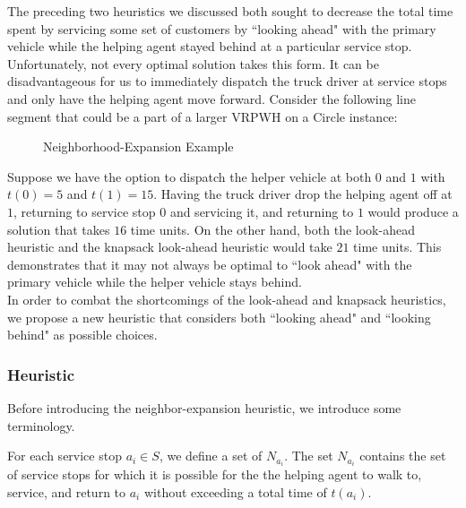 \documentclass[12pt]{scrartcl}
\begin{document}
The preceding two heuristics we discussed both sought to decrease the total time spent by servicing some set of customers by ``looking ahead" with the primary vehicle while the helping agent stayed behind at a particular service stop. \\

Unfortunately, not every optimal solution takes this form. It can be disadvantageous for us to immediately dispatch the truck driver at service stops and only have the helping agent move forward. Consider the following line segment that could be a part of a larger VRPWH on a Circle instance:

\begin{figure}[H]
  \centering
  \caption{Neighborhood-Expansion Example}
\end{figure}

Suppose we have the option to dispatch the helper vehicle at both $0$ and $1$ with $t(0) = 5$ and $t(1) = 15$. Having the truck driver drop the helping agent off at $1$, returning to service stop $0$ and servicing it, and returning to $1$ would produce a solution that takes $16$ time units. On the other hand, both the look-ahead heuristic and the knapsack look-ahead heuristic would take $21$ time units. This demonstrates that it may not always be optimal to ``look ahead" with the primary vehicle while the helper vehicle stays behind. \\

In order to combat the shortcomings of the look-ahead and knapsack heuristics, we propose a new heuristic that considers both ``looking ahead" and ``looking behind" as possible choices. 

\subsubsection{Heuristic}
Before introducing the neighbor-expansion heuristic, we introduce some terminology.

\begin{definition}
For each service stop $a_i \in S$, we define a set of  $N_{a_{i}}$. The set $N_{a_{i}}$ contains the set of service stops for which it is possible for the the helping agent to walk to, service, and return to $a_i$ without exceeding a total time of $t(a_i)$.  
\end{definition}
\end{document}
